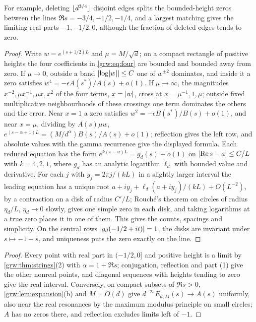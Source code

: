 For example, deleting $\lfloor d^{3/4}\rfloor$ disjoint edges splits the
bounded-height zeros between the lines $\Re s=-3/4,-1/2,-1/4$, and a largest
matching gives the limiting real parts $-1,-1/2,0$, although the fraction of
deleted edges tends to zero.

\begin{proof}
Write $w=e^{(s+1/2)L}$ and $\mu=M/\sqrt d$; on a compact rectangle of positive
heights the four coefficients in \eqref{grw:eq:four} are bounded and bounded
away from zero. If $\mu\to0$, outside a band $\lvert\log\lvert w\rvert\rvert\le C$ one of
$w^{\pm2}$ dominates, and inside it a zero satisfies
$w^4=-\epsilon A(s^*)/A(s)+o(1)$. If $\mu\to\infty$, the magnitudes
$x^{-2},\mu x^{-1},\mu x,x^2$ of the four terms, $x=\lvert w\rvert$, cross at
$x=\mu^{-1},1,\mu$; outside fixed multiplicative neighbourhoods of these
crossings one term dominates the others and the error. Near $x=1$ a zero
satisfies $w^2=-\epsilon B(s^*)/B(s)+o(1)$, and near $x=\mu$, dividing by
$A(s)\mu w$, $e^{(s-\alpha+1)L}=(M/d^\alpha)B(s)/A(s)+o(1)$; reflection gives
the left row, and absolute values with the gamma recurrence give the
displayed formula. Each reduced equation has the form
$e^{k(s-a)L}=g_d(s)+o(1)$ on $\lvert\operatorname{Re} s-a\rvert\le C/L$ with $k=4,2,1$, where
$g_d$ has an analytic logarithm $\ell_d$ with bounded value and derivative.
For each $j$ with $y_j=2\pi j/(kL)$ in a slightly larger interval the leading
equation has a unique root $a+iy_j+\ell_d(a+iy_j)/(kL)+O(L^{-2})$, by a
contraction on a disk of radius $C'/L$; Rouch\'e's theorem on circles of
radius $\eta_d/L$, $\eta_d\to0$ slowly, gives one simple zero in each disk,
and taking logarithms at a true zero places it in one of them. This gives
the counts, spacings and simplicity. On the central rows
$\lvert g_d(-1/2+it)\rvert=1$, the disks are invariant under $s\mapsto-1-\bar s$,
and uniqueness puts the zero exactly on the line.
\end{proof}


\begin{proof}
Every point with real part in $(-1/2,0]$ and positive height is a limit by
\cref{grw:thm:strings}(2) with $\alpha=1+\Re s$; conjugation, reflection and
part (1) give the other nonreal points, and diagonal sequences with heights
tending to zero give the real interval. Conversely, on compact subsets of
$\Re s>0$, \cref{grw:lem:expansion}(b) and $M=O(d)$ give
$d^{-2s}E_{d,M}(s)\to A(s)$ uniformly, also near the real resonances by the
maximum modulus principle on small circles; $A$ has no zeros there, and
reflection excludes limits left of $-1$.
\end{proof}

